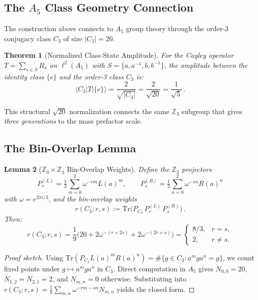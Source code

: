 \documentclass[11pt,a4paper]{article}
\newcommand{\Tr}{\mathrm{Tr}}
\newtheorem{theorem}{Theorem}
\newtheorem{lemma}[theorem]{Lemma}
\begin{document}
\subsection{The $A_5$ Class Geometry Connection}

The construction above connects to $A_5$ group theory through the order-3
conjugacy class $C_3$ of size $|C_3| = 20$.

\begin{theorem}[Normalized Class-State Amplitude]
\label{thm:class-amp}
For the Cayley operator $T = \sum_{s\in S} R_s$ on $\ell^2(A_5)$ with
$S = \{a,a^{-1},b,b^{-1}\}$, the amplitude between the identity class
$\{e\}$ and the order-3 class $C_3$ is:
\begin{equation}
\langle C_3 | T | \{e\}\rangle = \frac{2}{\sqrt{|C_3|}} = \frac{2}{\sqrt{20}} = \frac{1}{\sqrt{5}}\,.
\end{equation}
\end{theorem}

This structural $\sqrt{20}$ normalization connects the same $\mathbb{Z}_3$
subgroup that gives \emph{three generations} to the mass prefactor scale.

\subsection{The Bin-Overlap Lemma}

\begin{lemma}[$\mathbb{Z}_3\times\mathbb{Z}_3$ Bin-Overlap Weights]
\label{lem:bin}
Define the $\mathbb{Z}_3$ projectors
\begin{equation}
P_r^{(L)} = \tfrac{1}{3}\sum_{m=0}^{2}\omega^{-rm}L(a)^m,\qquad
P_s^{(R)} = \tfrac{1}{3}\sum_{n=0}^{2}\omega^{-sn}R(a)^n
\end{equation}
with $\omega = e^{2\pi i/3}$, and the bin-overlap weights
\begin{equation}
r(C_3;r,s) := \Tr\!\big(P_{C_3}\,P_r^{(L)}\,P_s^{(R)}\big)\,.
\end{equation}
Then:
\begin{equation}
\boxed{\quad r(C_3;r,s) = \frac{1}{9}\Big(20 + 2\omega^{-(r+2s)} + 2\omega^{-(2r+s)}\Big)
= \begin{cases} 8/3, & r=s,\\ 2, & r\neq s. \end{cases}\quad}
\label{eq:bin-overlap}
\end{equation}
\end{lemma}

\begin{proof}[Proof sketch]
Using $\Tr(P_{C_3}L(a)^m R(a)^n) = \#\{g\in C_3 : a^m g a^n = g\}$, we count
fixed points under $g\mapsto a^m g a^n$ in $C_3$.  Direct computation in $A_5$ gives
$N_{0,0}=20$, $N_{1,2}=N_{2,1}=2$, and $N_{m,n}=0$ otherwise.  Substituting
into $r(C_3;r,s) = \frac{1}{9}\sum_{m,n}\omega^{-rm-sn}N_{m,n}$ yields the
closed form.
\end{proof}
\end{document}
